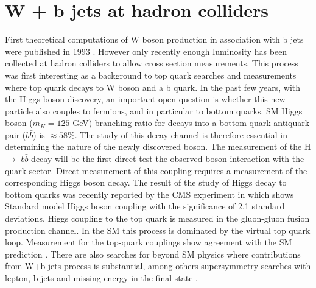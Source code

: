 
\section{W + b jets at hadron colliders}

First theoretical computations of W boson production in association with b jets were published in 1993 \cite{Mangano:1992kp}. However only recently enough luminosity has been collected at hadron colliders to allow cross section measurements. This process was first interesting as a background to top quark searches and measurements where top quark decays to W boson and a b quark. In the past few years, with the Higgs boson discovery, an important open question is whether this new particle also couples to fermions, and in particular to bottom quarks. 
SM Higgs boson ($m_H=125$ GeV) branching ratio for decays into a bottom quark-antiquark pair ($b\bar{b}$) is $\approx 58\%$. The study of this decay channel is therefore essential in determining the nature of the newly discovered boson. The measurement of the H $\rightarrow$ $b\bar{b}$ decay will be the first direct test the observed boson interaction with the quark sector. Direct measurement of this coupling requires a measurement of the corresponding Higgs boson decay. The result of the study of Higgs decay to bottom quarks was recently reported by the CMS experiment in  \cite{Chatrchyan:2013zna,Chatrchyan:2014vua} which shows Standard model Higgs boson coupling with the significance of 2.1 standard deviations. Higgs coupling to the top quark is measured in the gluon-gluon fusion production channel. In the SM this process is dominated by the virtual top quark loop. Measurement for the top-quark couplings show agreement with the SM prediction \cite{Khachatryan:2014jba}.
There are also searches for beyond SM physics where contributions from W+b jets process is substantial, among others supersymmetry searches with lepton, b jets and missing energy in the final state \cite{Chatrchyan:2012sca}.

